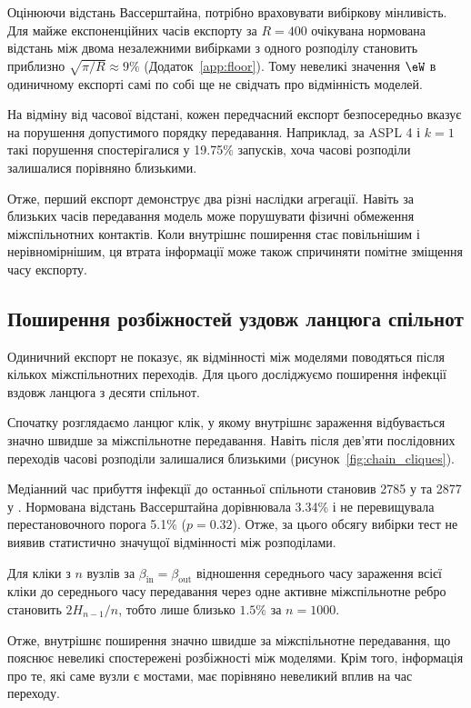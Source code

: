 Оцінюючи відстань Вассерштайна,
потрібно враховувати вибіркову мінливість.
Для майже експоненційних часів експорту
за $R=400$ очікувана нормована відстань
між двома незалежними вибірками
з одного розподілу становить приблизно
$\sqrt{\pi/R}\approx9\%$
(Додаток~\ref*{app:floor}).
Тому невеликі значення $\eW$
в одиничному експорті самі по собі
ще не свідчать про відмінність моделей.

На відміну від часової відстані,
кожен передчасний експорт безпосередньо
вказує на порушення допустимого порядку
передавання. Наприклад, за ASPL 4
і $k=1$ такі порушення спостерігалися
у 19.75\% запусків, хоча часові
розподіли залишалися порівняно близькими.

Отже, перший експорт демонструє
два різні наслідки агрегації.
Навіть за близьких часів передавання
модель може порушувати фізичні
обмеження міжспільнотних контактів.
Коли внутрішнє поширення стає повільнішим
і нерівномірнішим, ця втрата інформації
може також спричиняти помітне
зміщення часу експорту.


\subsection{Поширення розбіжностей
уздовж ланцюга спільнот}
\label{sec:res_chain_random}

Одиничний експорт не показує,
як відмінності між моделями поводяться
після кількох міжспільнотних переходів.
Для цього досліджуємо поширення інфекції
вздовж ланцюга з десяти спільнот.

Спочатку розглядаємо ланцюг клік,
у якому внутрішнє зараження відбувається
значно швидше за міжспільнотне передавання.
Навіть після дев'яти послідовних переходів
часові розподіли залишалися близькими
(рисунок~\ref{fig:chain_cliques}).

Медіанний час прибуття інфекції
до останньої спільноти становив
2785 у \Full{} та 2877 у \TS{}.
Нормована відстань Вассерштайна
дорівнювала 3.34\% і не перевищувала
перестановочного порога 5.1\%
($p=0.32$). Отже, за цього обсягу
вибірки тест не виявив статистично
значущої відмінності між розподілами.

Для кліки з $n$ вузлів за
$\beta_{\mathrm{in}}=\beta_{\mathrm{out}}$
відношення середнього часу зараження
всієї кліки до середнього часу
передавання через одне активне
міжспільнотне ребро становить
$2H_{n-1}/n$, тобто лише близько
$1.5\%$ за $n=1000$.

Отже, внутрішнє поширення значно
швидше за міжспільнотне передавання,
що пояснює невеликі спостережені
розбіжності між моделями. Крім того, інформація про те, які саме вузли є мостами, має порівняно невеликий вплив на час переходу.

